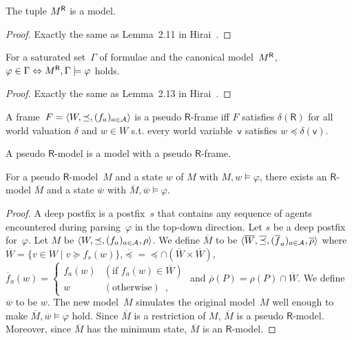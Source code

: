   \begin{proposition}
   The tuple ${M}^{\mathsf R}$ is a model.
  \end{proposition}
  \begin{proof}
   Exactly the same as Lemma~2.11 in Hirai~\cite{hirailpar}.
  \end{proof}

  \begin{proposition}
   \label{X}
   For a saturated set~$\Gamma$ of formulae and the canonical model~${M}^{\mathsf R}$,
   $\varphi\in\Gamma\Leftrightarrow {M}^{\mathsf R},\Gamma\models\varphi$ holds.
  \end{proposition}
  \begin{proof}
   Exactly the same as Lemma~2.13 in Hirai~\cite{hirailpar}.
  \end{proof}

  \begin{definition}
   A frame~$F = \langle{W,\preceq, (f_a)_{a\in\mathcal A}}\rangle$
   is a pseudo $\mathsf R$-frame iff $F$ satisfies
   $\delta(\mathsf R)$ for all world valuation
   $\delta$ and $w\in W$ s.t.
   every world variable~$\mathsf v$ satisfies
   $w\preceq \delta(\mathsf v)$.
  \end{definition}
  A pseudo $\mathsf R$-model is a model with a pseudo $\mathsf R$-frame.

  \begin{proposition}
   \label{pseudo-real}
   For a pseudo $\mathsf R$-model~$M$ and a state $w$ of $M$ with
   $M,w\models\varphi$,
   there exists an $\mathsf R$-model $\overline M$ and a state $\overline w$
   with $\overline M,\overline w\models\varphi$.
  \end{proposition}
  \begin{proof}
   A deep postfix is a postfix~$s$ that contains any sequence of agents
   encountered during parsing~$\varphi$ in the top-down direction.
   Let $s$ be a deep postfix for~$\varphi$. Let $M$ be
   $\langle{W,\preceq,(f_a)_{a\in\mathcal A},\rho}\rangle$.
   We define $\overline M$ to be $\langle{\overline W,\overline\preceq,
   (\overline f_a)_{a\in\mathcal A},\overline \rho}\rangle$ where
   $\overline W=\{v\in W\mid v\succeq f_s(w)\}$,$\overline\preceq =
   \preceq\cap (\overline W\times\overline W)$,
   $\overline f_a(w)= \begin{cases}
		  f_a(w)&(\mbox{if }f_a(w)\in\overline W)\\
		  w&(\mbox{otherwise})\enspace,
		 \end{cases}$
   and $\overline \rho(P) =\rho(P)\cap\overline W$.
   We define $\overline w$ to be $w$.
   The new model~$\overline M$ simulates the original model~$M$ well enough
   to make $\overline M,\overline w\models\varphi$ hold.
   Since $\overline M$ is a restriction of $M$, $\overline M$ is a pseudo
   $\mathsf R$-model.
   Moreover, since $\overline M$ has the minimum state, $\overline M$ is an
   $\mathsf R$-model.
  \end{proof}

